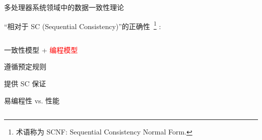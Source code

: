 \begin{frame}{多处理器系统领域中的数据一致性理论}
  \vspace{0.20cm}

  ``相对于 SC {\small (Sequential Consistency)}''的正确性~\footnote{术语称为 SCNF: Sequential Consistency Normal Form.} :

  \begin{columns}
	  \begin{description}
		\item[一致性:] 一致性模型 + \textcolor{red}{编程模型}
		\item[程序:] 遵循预定规则
		\item[系统:] 提供 SC 保证
		\item<3>[权衡:] 易编程性 vs. 性能
	  \end{description}
  \end{columns}

\end{frame}
